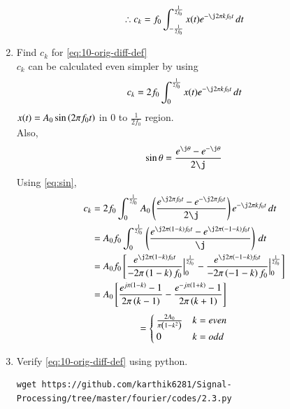 \documentclass[journal,12pt,twocolumn]{IEEEtran}
\renewcommand\thesection{\arabic{section}}
\begin{document}
\begin{enumerate}[label=\thesection.\arabic*,ref=\thesection.\theenumi]
\begin{align}
  \therefore c_k = f_0\int_{-\frac{1}{2f_0}}^{\frac{1}{2f_0}}x(t)e^{-\j2\pi kf_0 t}\, dt
    \end{align}
	\item Find $c_k$ for 
	\eqref{eq:10-orig-diff-def}\\
	\solution
	$c_k$ can be calculated even simpler by using
	\begin{align}
	c_k = 2f_0\int_{0}^{\frac{1}{2f_0}}x(t)e^{- \j2 \pi kf_0 t}\, dt
	\end{align}
	$x(t)=A_0 \sin\left(2 \pi f_0t\right)$ in 0 to $\frac{1}{2f_0}$ region.\\
Also,
	\begin{align}
	\label{eq:sin}
 \sin \theta  =\frac{e^{\j\theta}-e^{-\j \theta}}{2\j} 
  \end{align}
  Using \eqref{eq:sin},
  \begin{align}
  c_k &= 2f_0\int_{0}^{\frac{1}{2f_0}}A_0 \brak{\frac{e^{\j2\pi f_0t}-e^{-\j 2\pi f_0t}}{2\j}} e^{- \j2 \pi kf_0 t}\,dt\\
  &=A_0f_0\int_{0}^{\frac{1}{2f_0}} \brak{\frac{e^{\j2\pi\brak{1-k} f_0t}-e^{\j 2\pi\brak{-1-k} f_0t}}{\j}}\,dt\\
&=A_0f_0\sbrak{\frac{e^{\j2\pi\brak{1-k} f_0t}}{-2\pi \brak{1-k}f_0}\Big|_0^{\frac{1}{2f_0}} - \frac{e^{\j2\pi\brak{-1-k} f_0t}}{-2\pi \brak{-1-k}f_0}\Big|_0^{\frac{1}{2f_0}}}\\
&=A_0\sbrak{\frac{e^{j\pi\brak{1-k}}-1}{2\pi\brak{k-1}}-\frac{e^{-j\pi\brak{1+k}}-1}{2\pi\brak{k+1}}}
  \end{align}
  \begin{equation}
  \label{eq:ck}
 = \begin{cases}
\frac{2A_0}{\pi\left(1-k^2\right)}&k=even
\\
0&k=odd
\end{cases}
  \end{equation}
\item Verify 
	\eqref{eq:10-orig-diff-def}
	using python.\\
	\solution
\begin{lstlisting}
wget https://github.com/karthik6281/Signal-Processing/tree/master/fourier/codes/2.3.py 
\end{lstlisting}
\begin{figure}[!ht]
	\centering

\end{figure}
\end{enumerate}
\end{document}

